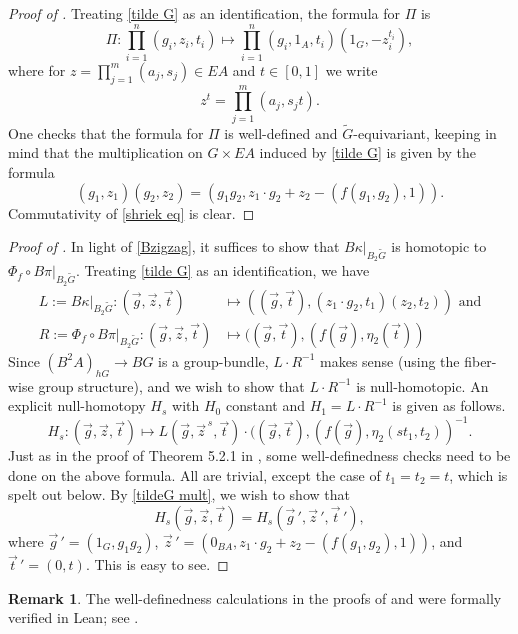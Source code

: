 \documentclass[12 pt]{article}
\theoremstyle{definition}
\newtheorem{remark}[theorem]{Remark}
\begin{document}
\begin{proof}[Proof of ]
Treating \eqref{tilde G} as an identification, the formula for $\Pi$ is
\begin{equation*}\label{Pi}
\Pi:\prod_{i=1}^n(g_i, z_i, t_i)\mapsto\prod_{i=1}^n(g_i,1_{A},t_i)(1_{G},-z_i^{t_i}),
\end{equation*}
where for $\displaystyle z=\prod_{j=1}^m(a_j,s_j)\in EA$ and $t\in [0,1]$ we write
$$z^t=\prod_{j=1}^m(a_j,s_jt).$$
One checks that the formula for $\Pi$ is well-defined and $\tilde G$-equivariant, keeping in mind that the multiplication on $G\times EA$ induced by \eqref{tilde G} is given by the formula
\begin{equation}\label{tildeG mult}
(g_1,z_1)(g_2,z_2)=(g_1g_2,z_1\cdot g_2+z_2-(f(g_1,g_2),1)).
\end{equation}
Commutativity of \eqref{shriek eq} is clear.
\end{proof}

\begin{proof}[Proof of ]
In light of \eqref{Bzigzag}, it suffices to show that $B\kappa|_{B_2\tilde G}$ is homotopic to $\Phi_f\circ B\pi|_{B_2\tilde G}$. Treating \eqref{tilde G} as an identification, we have
\begin{align*}
L:=B\kappa|_{B_2\tilde G}:(\vec{g},\vec{z},\vec{t})&\mapsto((\vec{g},\vec{t}),(z_1\cdot g_2,t_1)(z_2,t_2))\text{ and}\\
R:=\Phi_f\circ B\pi|_{B_2\tilde G}:(\vec{g},\vec{z},\vec{t})&\mapsto ((\vec{g},\vec{t}),(f(\vec g), \eta_2(\vec t))
\end{align*}
Since $(B^2A)_{hG}\to BG$ is a group-bundle, $L\cdot R^{-1}$ makes sense (using the fiber-wise group structure), and we wish to show that $L\cdot R^{-1}$ is null-homotopic. An explicit null-homotopy $H_s$ with $H_0$ constant and $H_1=L\cdot R^{-1}$ is given as follows.
$$H_s:(\vec{g},\vec{z},\vec{t})\mapsto L(\vec{g},\vec{z}^{\,s},\vec{t})\cdot ((\vec{g},\vec{t}),(f(\vec g), \eta_2(st_1,t_2))^{-1}.$$
Just as in the proof of Theorem 5.2.1 in \cite{Ja}, some well-definedness checks need to be done on the above formula. All are trivial, except the case of $t_1=t_2=t$, which is spelt out below. By \eqref{tildeG mult}, we wish to show that
$$H_s(\vec{g},\vec{z},\vec{t})=H_s(\vec{g}\,',\vec{z}\,',\vec{t}\,'),$$
where $\vec{g}\,'=(1_G,g_1g_2)$, $\vec{z}\,'=(0_{BA},z_1\cdot g_2+z_2-(f(g_1,g_2),1))$, and $\vec{t}\,'=(0,t)$. This is easy to see.
\end{proof}

\begin{remark}
The well-definedness calculations in the proofs of  and  were formally verified in Lean; see .
\end{remark}
\end{document}
